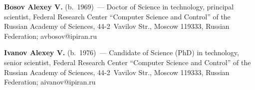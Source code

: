 \Contr

\vspace*{-4pt}

\noindent
\textbf{Bosov Alexey V.} (b.\ 1969)~--- Doctor of Science in technology, 
principal scientist, Federal Research Center ``Computer Science and Control'' of 
the Russian Academy of Sciences, 44-2~Vavilov Str., Moscow 119333, Russian 
Federation; \mbox{avbosov@ipiran.ru}

\vspace*{3pt}

\noindent
\textbf{Ivanov Alexey V.} (b.\ 1976)~--- Candidate of Science (PhD) in 
technology, senior scientist, Federal Research Center ``Computer Science and 
Control'' of the Russian Academy of Sciences, 44-2~Vavilov Str., Moscow 
119333, Russian Federation; \mbox{aivanov@ipiran.ru}

\label{end\stat}

\renewcommand{\bibname}{\protect\rm Литература} 